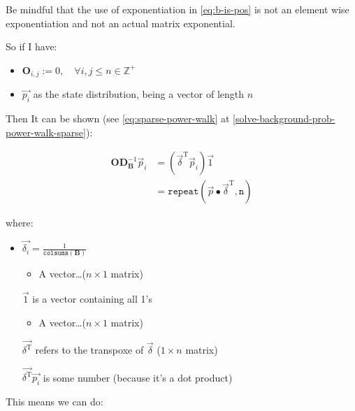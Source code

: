 \documentclass[11pt]{report}
\begin{document}
Be mindful that the use of exponentiation in \eqref{eq:b-is-pos} is not an element wise
exponentiation and not an actual matrix exponential.

So if I have:

\begin{itemize}
\item \(\mathbf{O}_{i, j} := 0, \quad \forall i,j\leq n \in \mathbb{Z}^+\)

\item \(\vec{p_i}\) as the state distribution, being a vector of length \(n\)
\end{itemize}

Then It can be shown (see \eqref{eq:sparse-power-walk} at \ref{solve-background-prob-power-walk-sparse}):

\begin{align}
	\mathbf{O} \mathbf{D}_{\mathbf{B}}^{- 1} \vec{p}_{i} &= \left( \vec{\delta}^{\mathrm{T}} \vec{p}_{i} \right) \vec{1} \\
	&=    \mathtt{repeat} \left( \vec{p} \bullet \vec{\delta}^{\mathrm{T}}, \mathtt{n}  \right)
\end{align}




where:

\begin{itemize}
\item \(\vec{\delta_i} = \frac{1}{\mathtt{colsums} \left( \mathbf{B} \right)}\)
\begin{itemize}
\item A vector\ldots{}(\(n\times 1\) matrix)
\end{itemize}
\item[{\(\vec{1}\) }] is a vector containing all 1's
\begin{itemize}
\item A vector\ldots{}(\(n\times 1\) matrix)
\end{itemize}
\item[{\(\vec{\delta^{\mathrm{T}}}\)}] refers to the transpoxe of \(\vec{\delta}\) (\(1\times n\) matrix)
\item[{\(\vec{\delta^{\mathrm{T}}} \vec{p_{i}}\)}] is some number (because it's a dot product)
\end{itemize}

This means we can do:
\end{document}
